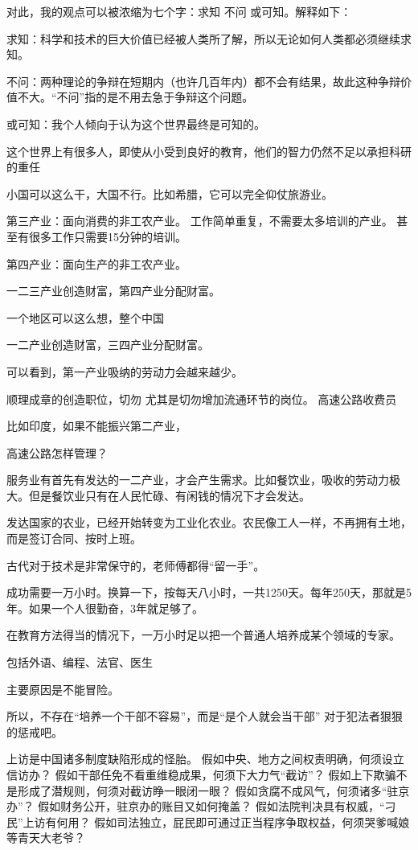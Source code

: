 对此，我的观点可以被浓缩为七个字：求知 不问 或可知。解释如下：

求知：科学和技术的巨大价值已经被人类所了解，所以无论如何人类都必须继续求知。

不问：两种理论的争辩在短期内（也许几百年内）都不会有结果，故此这种争辩价值不大。“不问”指的是不用去急于争辩这个问题。

或可知：我个人倾向于认为这个世界最终是可知的。

这个世界上有很多人，即使从小受到良好的教育，他们的智力仍然不足以承担科研的重任

小国可以这么干，大国不行。比如希腊，它可以完全仰仗旅游业。

第三产业：面向消费的非工农产业。
工作简单重复，不需要太多培训的产业。
甚至有很多工作只需要15分钟的培训。

第四产业：面向生产的非工农产业。


一二三产业创造财富，第四产业分配财富。

一个地区可以这么想，整个中国

一二产业创造财富，三四产业分配财富。

可以看到，第一产业吸纳的劳动力会越来越少。

顺理成章的创造职位，切勿
尤其是切勿增加流通环节的岗位。
高速公路收费员

比如印度，如果不能振兴第二产业，

高速公路怎样管理？

服务业有首先有发达的一二产业，才会产生需求。比如餐饮业，吸收的劳动力极大。但是餐饮业只有在人民忙碌、有闲钱的情况下才会发达。

发达国家的农业，已经开始转变为工业化农业。农民像工人一样，不再拥有土地，而是签订合同、按时上班。

古代对于技术是非常保守的，老师傅都得“留一手”。

成功需要一万小时。换算一下，按每天八小时，一共1250天。每年250天，那就是5年。如果一个人很勤奋，3年就足够了。

在教育方法得当的情况下，一万小时足以把一个普通人培养成某个领域的专家。

包括外语、编程、法官、医生

主要原因是不能冒险。

所以，不存在“培养一个干部不容易”，而是“是个人就会当干部”
对于犯法者狠狠的惩戒吧。


上访是中国诸多制度缺陷形成的怪胎。
假如中央、地方之间权责明确，何须设立信访办？
假如干部任免不看重维稳成果，何须下大力气“截访”？
假如上下欺骗不是形成了潜规则，何须对截访睁一眼闭一眼？
假如贪腐不成风气，何须诸多“驻京办”？
假如财务公开，驻京办的账目又如何掩盖？
假如法院判决具有权威，“刁民”上访有何用？
假如司法独立，屁民即可通过正当程序争取权益，何须哭爹喊娘等青天大老爷？

